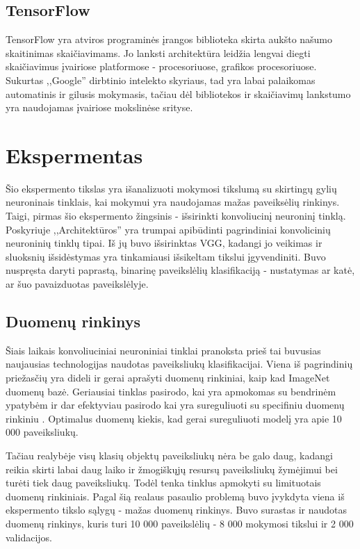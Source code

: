\documentclass{VUMIFPSkursinis}
\begin{document}
\subsection{TensorFlow}
TensorFlow yra atviros programinės įrangos biblioteka skirta aukšto našumo skaitinimas skaičiavimams. Jo lanksti architektūra leidžia lengvai diegti skaičiavimus įvairiose 
platformose - procesoriuose, grafikos procesoriuose. Sukurtas ,,Google'' dirbtinio intelekto skyriaus, tad yra labai palaikomas automatinis ir gilusis mokymasis, tačiau 
dėl bibliotekos ir skaičiavimų lankstumo yra naudojamas įvairiose mokslinėse srityse.

\section{Ekspermentas}
Šio ekspermento tikslas yra išanalizuoti mokymosi tikslumą su skirtingų gylių neuroninais tinklais, kai mokymui yra naudojamas mažas paveiksėlių rinkinys. Taigi, pirmas šio ekspermento žingsinis - išsirinkti konvoliucinį neuroninį tinklą. Poskyriuje ,,Architektūros'' yra trumpai apibūdinti pagrindiniai konvolicinių neuroninių tinklų tipai. Iš jų buvo išsirinktas VGG, kadangi jo veikimas ir sluoksnių išsidėstymas yra tinkamiausi išsikeltam tikslui įgyvendiniti. Buvo nuspręsta daryti paprastą, binarinę paveikslėlių klasifikaciją - nustatymas ar katė, ar šuo pavaizduotas paveikslėlyje.

\subsection{Duomenų rinkinys}
Šiais laikais konvoliuciniai neuroniniai tinklai pranoksta prieš tai buvusias naujausias technologijas naudotas paveiksliukų klasifikacijai. Viena iš pagrindinių priežasčių yra dideli ir gerai aprašyti duomenų rinkiniai, kaip kad ImageNet duomenų bazė. Geriausiai tinklas pasirodo, kai yra apmokomas su bendrinėm ypatybėm ir dar efektyviau pasirodo kai yra sureguliuoti su specifiniu duomenų rinkiniu \cite{http://adas.cvc.uab.es/task-cv2016/papers/0002.pdf}. Optimalus duomenų kiekis, kad gerai sureguliuoti modelį yra apie 10 000 paveiksliukų. 

Tačiau realybėje visų klasių objektų paveiksliukų nėra be galo daug, kadangi reikia skirti labai daug laiko ir žmogiškųjų resursų paveiksliukų žymėjimui bei turėti tiek daug paveiksliukų. Todėl tenka tinklus apmokyti su limituotais duomenų rinkiniais. Pagal šią realaus pasaulio problemą buvo įvykdyta viena iš ekspermento tikslo sąlygų - mažas duomenų rinkinys. Buvo surastas ir naudotas duomenų rinkinys, kuris turi 10 000 paveikslėlių - 8 000 mokymosi tikslui ir 2 000 validacijos.
\end{document}
